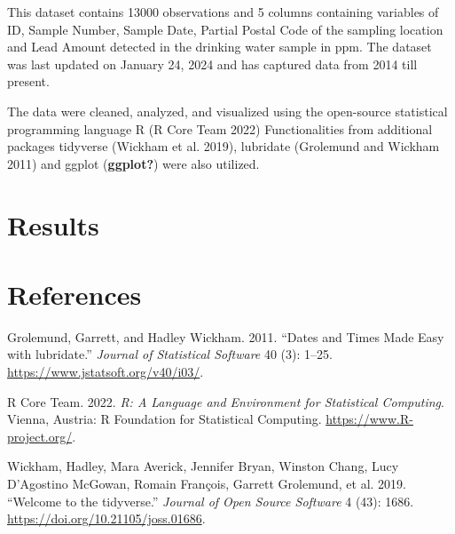 \documentclass[
  letterpaper,
  DIV=11,
  numbers=noendperiod]{scrartcl}
\newlength{\cslhangindent}
\newlength{\cslentryspacingunit} %
\newenvironment{CSLReferences}[2] %
 {%
  \setlength{\parindent}{0pt}
  \ifodd #1
  \let\oldpar\par
  \def\par{\hangindent=\cslhangindent\oldpar}
  \fi
  \setlength{\parskip}{#2\cslentryspacingunit}
 }%
 {}
\begin{document}
This dataset contains 13000 observations and 5 columns containing
variables of ID, Sample Number, Sample Date, Partial Postal Code of the
sampling location and Lead Amount detected in the drinking water sample
in ppm. The dataset was last updated on January 24, 2024 and has
captured data from 2014 till present.

The data were cleaned, analyzed, and visualized using the open-source
statistical programming language R (R Core Team 2022) Functionalities
from additional packages tidyverse (Wickham et al. 2019), lubridate
(Grolemund and Wickham 2011) and ggplot (\textbf{ggplot?}) were also
utilized.

\hypertarget{results}{%
\section{Results}\label{results}}

\begin{table}

\end{table}

\newpage

\hypertarget{references}{%
\section*{References}\label{references}}

\hypertarget{refs}{}
\begin{CSLReferences}{1}{0}
\leavevmode{}%
Grolemund, Garrett, and Hadley Wickham. 2011. {``Dates and Times Made
Easy with {lubridate}.''} \emph{Journal of Statistical Software} 40 (3):
1--25. \url{https://www.jstatsoft.org/v40/i03/}.

\leavevmode{}%
R Core Team. 2022. \emph{R: A Language and Environment for Statistical
Computing}. Vienna, Austria: R Foundation for Statistical Computing.
\url{https://www.R-project.org/}.

\leavevmode{}%
Wickham, Hadley, Mara Averick, Jennifer Bryan, Winston Chang, Lucy
D'Agostino McGowan, Romain François, Garrett Grolemund, et al. 2019.
{``Welcome to the {tidyverse}.''} \emph{Journal of Open Source Software}
4 (43): 1686. \url{https://doi.org/10.21105/joss.01686}.

\end{CSLReferences}
\end{document}

